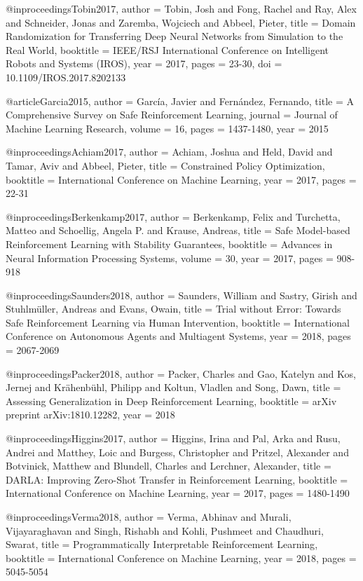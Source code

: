 @inproceedings{Tobin2017,
  author = {Tobin, Josh and Fong, Rachel and Ray, Alex and Schneider, Jonas and Zaremba, Wojciech and Abbeel, Pieter},
  title = {Domain Randomization for Transferring Deep Neural Networks from Simulation to the Real World},
  booktitle = {IEEE/RSJ International Conference on Intelligent Robots and Systems (IROS)},
  year = {2017},
  pages = {23-30},
  doi = {10.1109/IROS.2017.8202133}
}

@article{Garcia2015,
  author = {García, Javier and Fernández, Fernando},
  title = {A Comprehensive Survey on Safe Reinforcement Learning},
  journal = {Journal of Machine Learning Research},
  volume = {16},
  pages = {1437-1480},
  year = {2015}
}

@inproceedings{Achiam2017,
  author = {Achiam, Joshua and Held, David and Tamar, Aviv and Abbeel, Pieter},
  title = {Constrained Policy Optimization},
  booktitle = {International Conference on Machine Learning},
  year = {2017},
  pages = {22-31}
}

@inproceedings{Berkenkamp2017,
  author = {Berkenkamp, Felix and Turchetta, Matteo and Schoellig, Angela P. and Krause, Andreas},
  title = {Safe Model-based Reinforcement Learning with Stability Guarantees},
  booktitle = {Advances in Neural Information Processing Systems},
  volume = {30},
  year = {2017},
  pages = {908-918}
}

@inproceedings{Saunders2018,
  author = {Saunders, William and Sastry, Girish and Stuhlmüller, Andreas and Evans, Owain},
  title = {Trial without Error: Towards Safe Reinforcement Learning via Human Intervention},
  booktitle = {International Conference on Autonomous Agents and Multiagent Systems},
  year = {2018},
  pages = {2067-2069}
}

@inproceedings{Packer2018,
  author = {Packer, Charles and Gao, Katelyn and Kos, Jernej and Krähenbühl, Philipp and Koltun, Vladlen and Song, Dawn},
  title = {Assessing Generalization in Deep Reinforcement Learning},
  booktitle = {arXiv preprint arXiv:1810.12282},
  year = {2018}
}

@inproceedings{Higgins2017,
  author = {Higgins, Irina and Pal, Arka and Rusu, Andrei and Matthey, Loic and Burgess, Christopher and Pritzel, Alexander and Botvinick, Matthew and Blundell, Charles and Lerchner, Alexander},
  title = {DARLA: Improving Zero-Shot Transfer in Reinforcement Learning},
  booktitle = {International Conference on Machine Learning},
  year = {2017},
  pages = {1480-1490}
}

@inproceedings{Verma2018,
  author = {Verma, Abhinav and Murali, Vijayaraghavan and Singh, Rishabh and Kohli, Pushmeet and Chaudhuri, Swarat},
  title = {Programmatically Interpretable Reinforcement Learning},
  booktitle = {International Conference on Machine Learning},
  year = {2018},
  pages = {5045-5054}
}

